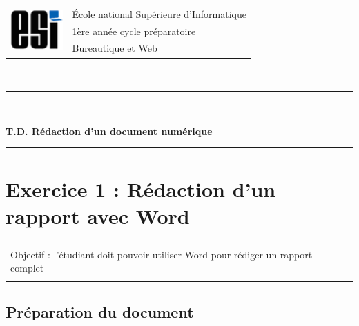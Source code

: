\documentclass[11pt, a4paper]{article}
\begin{document}

\noindent
\begin{tabular}{ll}
\multirow{3}{*}{\includegraphics[width=2cm]{../esi-logo.png}} & \'Ecole national Supérieure d'Informatique\\
& 1ère année cycle préparatoire\\
& Bureautique et Web
\end{tabular}\\[.25cm]
\noindent\rule{\textwidth}{1pt}\\%
\begin{center}
{\LARGE \textbf{T.D. Rédaction d'un document numérique}}
\end{center}
\noindent\rule{\textwidth}{1pt}

\section*{Exercice 1 : Rédaction d'un rapport avec Word}

\vspace{-12pt}
\begin{tabular}{|p{\textwidth}|}
	\hline\\
	Objectif : l'étudiant doit pouvoir utiliser Word pour rédiger un rapport complet \\\\
	\hline
\end{tabular}

\subsection*{Préparation du document}
\end{document}
